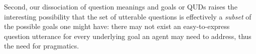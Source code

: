 \documentclass[12pt, floatsintext, jou]{apa6}
\begin{document}
Second, our dissociation of question meanings and goals or QUDs raises the interesting possibility that the set of utterable questions is effectively a \emph{subset} of the possible goals one might have: there may not exist an easy-to-express question utterance for every underlying goal an agent may need to address, thus the need for pragmatics.




\end{document}
